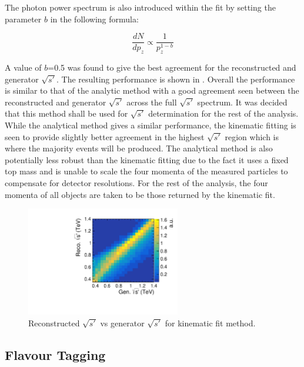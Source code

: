The photon power spectrum is also introduced within the fit by setting the parameter $b$ in the following formula:

\begin{equation}
\frac{dN}{dp_z}\propto\frac{1}{p_z^{1-b}}
\end{equation}

A value of $b$=0.5 was found to give the best agreement for the reconstructed and generator $\sqrt{s'}$. The resulting performance is shown in . Overall the performance is similar to that of the analytic method with a good agreement seen between the reconstructed and generator $\sqrt{s'}$ across the full $\sqrt{s'}$ spectrum. It was decided that this method shall be used for $\sqrt{s'}$ determination for the rest of the analysis. While the analytical method gives a similar performance, the kinematic fitting is seen to provide slightly better agreement in the highest $\sqrt{s'}$ region which is where the majority events will be produced. The analytical method is also potentially less robust than the kinematic fitting due to the fact it uses a fixed top mass and is unable to scale the four momenta of the measured particles to compensate for detector resolutions. For the rest of the analysis, the four momenta of all objects are taken to be those returned by the kinematic fit.

\begin{figure}
  \centering
  \includegraphics[width=0.6\textwidth]{TopAnalysis/figures/KinEVsTrueE.pdf}
  \caption[Reconstructed $\sqrt{s'}$ vs generator $\sqrt{s'}$ for kinematic fit  method]{Reconstructed $\sqrt{s'}$ vs generator $\sqrt{s'}$ for kinematic fit method.}
  \label{fig:KinFit}
\end{figure}

\subsection{Flavour Tagging}
\label{Flavour Tagging}

